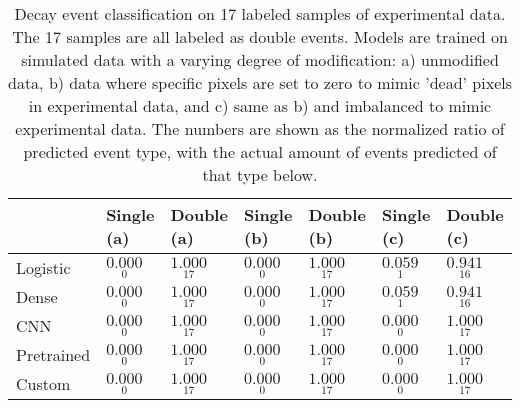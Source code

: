 \begin{table}
\centering
\caption{
Decay event classification on 17 labeled samples of experimental data. The 17 samples are all
labeled as double events. Models are trained on simulated data with a varying degree of modification:
a) unmodified data, b) data where specific pixels are set to zero to mimic
'dead' pixels in experimental data, and c) same as b) and imbalanced to mimic experimental data.
The numbers are shown as the normalized ratio of predicted event type, with the actual amount of
events predicted of that type below.
}
\label{tab:classification-experimental-labeled-doubles}
\begin{tabular}{lllllll}
\toprule
{} &                                Single (a) &                                 Double (a) &                                Single (b) &                                 Double (b) &                                Single (c) &                                 Double (c) \\
\midrule
Logistic   &  $\underset{\num{ 0 }  }{\num{ 0.000 } }$ &  $\underset{\num{ 17 }  }{\num{ 1.000 } }$ &  $\underset{\num{ 0 }  }{\num{ 0.000 } }$ &  $\underset{\num{ 17 }  }{\num{ 1.000 } }$ &  $\underset{\num{ 1 }  }{\num{ 0.059 } }$ &  $\underset{\num{ 16 }  }{\num{ 0.941 } }$ \\
Dense      &  $\underset{\num{ 0 }  }{\num{ 0.000 } }$ &  $\underset{\num{ 17 }  }{\num{ 1.000 } }$ &  $\underset{\num{ 0 }  }{\num{ 0.000 } }$ &  $\underset{\num{ 17 }  }{\num{ 1.000 } }$ &  $\underset{\num{ 1 }  }{\num{ 0.059 } }$ &  $\underset{\num{ 16 }  }{\num{ 0.941 } }$ \\
CNN        &  $\underset{\num{ 0 }  }{\num{ 0.000 } }$ &  $\underset{\num{ 17 }  }{\num{ 1.000 } }$ &  $\underset{\num{ 0 }  }{\num{ 0.000 } }$ &  $\underset{\num{ 17 }  }{\num{ 1.000 } }$ &  $\underset{\num{ 0 }  }{\num{ 0.000 } }$ &  $\underset{\num{ 17 }  }{\num{ 1.000 } }$ \\
Pretrained &  $\underset{\num{ 0 }  }{\num{ 0.000 } }$ &  $\underset{\num{ 17 }  }{\num{ 1.000 } }$ &  $\underset{\num{ 0 }  }{\num{ 0.000 } }$ &  $\underset{\num{ 17 }  }{\num{ 1.000 } }$ &  $\underset{\num{ 0 }  }{\num{ 0.000 } }$ &  $\underset{\num{ 17 }  }{\num{ 1.000 } }$ \\
Custom     &  $\underset{\num{ 0 }  }{\num{ 0.000 } }$ &  $\underset{\num{ 17 }  }{\num{ 1.000 } }$ &  $\underset{\num{ 0 }  }{\num{ 0.000 } }$ &  $\underset{\num{ 17 }  }{\num{ 1.000 } }$ &  $\underset{\num{ 0 }  }{\num{ 0.000 } }$ &  $\underset{\num{ 17 }  }{\num{ 1.000 } }$ \\
\bottomrule
\end{tabular}
\end{table}
